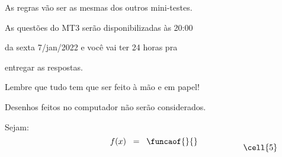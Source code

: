 \documentclass[oneside,12pt]{article}
\begin{document}
\bsk

As regras vão ser as mesmas dos outros mini-testes.

As questões do MT3 serão disponibilizadas às 20:00

da sexta 7/jan/2022 e você vai ter 24 horas pra

entregar as respostas.


\bsk

Lembre que tudo tem que ser feito à mão e em papel!

Desenhos feitos no computador não serão considerados.

\newpage



%
\pu

\def\funcaofnumeros{%
    \def\cellfont{\scriptsize}%
    \put(5,-0.6){\cell{5}}%
    \put(10,-0.6){\cell{10}}%
  }

Sejam:
%
\vspace*{-0.25cm}
%
$$f(x) \;\;=\;\;
  \unitlength=12pt
  \funcaof{}{\funcaofnumeros}
$$
\end{document}
